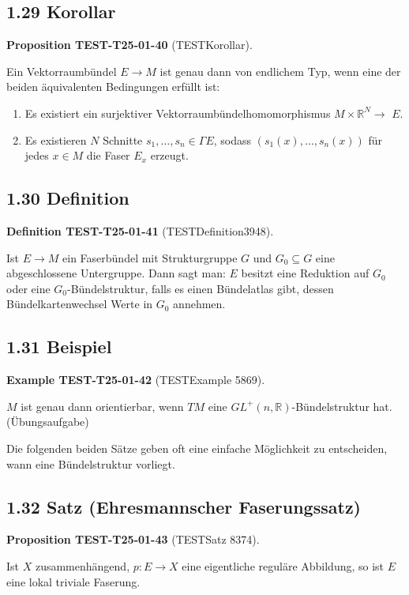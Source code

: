 \documentclass[10pt, letterpaper]{article}
\newcommand{\CustomHeading}[3]{%
  \par\medskip\noindent%
  \textbf{#1 #2} \textnormal{(#3)}.\enskip%
}
\newenvironment{DEF}[2]{\begin{unitbox}\CustomHeading{Definition}{#1}{#2}}{\end{unitbox}}
\newenvironment{PROP}[2]{\begin{unitbox}\CustomHeading{Proposition}{#1}{#2}}{\end{unitbox}}
\newenvironment{EXA}[2]{\begin{unitbox}\CustomHeading{Example}{#1}{#2}}{\end{unitbox}}
\begin{document}
\subsection*{1.29 Korollar}
\begin{PROP}{TEST-T25-01-40}{TESTKorollar}
Ein Vektorraumbündel $E \rightarrow M$ ist genau dann von endlichem Typ, wenn eine der beiden äquivalenten Bedingungen erfüllt ist:

\begin{enumerate}
  \item Es existiert ein surjektiver Vektorraumbündelhomomorphismus $M \times \mathbb{R}^{N} \rightarrow$ $E$.
  \item Es existieren $N$ Schnitte $s_{1}, \ldots, s_{n} \in \Gamma E$, sodass $\left(s_{1}(x), \ldots, s_{n}(x)\right)$ für jedes $x \in M$ die Faser $E_{x}$ erzeugt.
\end{enumerate}
\end{PROP}

\subsection*{1.30 Definition}
\begin{DEF}{TEST-T25-01-41}{TESTDefinition3948}
Ist $E \rightarrow M$ ein Faserbündel mit Strukturgruppe $G$ und $G_{0} \subseteq G$ eine abgeschlossene Untergruppe. Dann sagt man: $E$ besitzt eine Reduktion auf $G_{0}$ oder eine $G_{0}$-Bündelstruktur, falls es einen Bündelatlas gibt, dessen Bündelkartenwechsel Werte in $G_{0}$ annehmen.
\end{DEF}

\subsection*{1.31 Beispiel}
\begin{EXA}{TEST-T25-01-42}{TESTExample 5869}
$M$ ist genau dann orientierbar, wenn $T M$ eine $G L^{+}(n, \mathbb{R})$-Bündelstruktur hat. (Übungsaufgabe)

Die folgenden beiden Sätze geben oft eine einfache Möglichkeit zu entscheiden, wann eine Bündelstruktur vorliegt.
\end{EXA}

\subsection*{1.32 Satz (Ehresmannscher Faserungssatz)}
\begin{PROP}{TEST-T25-01-43}{TESTSatz 8374}
Ist $X$ zusammenhängend, $p: E \rightarrow X$ eine eigentliche reguläre Abbildung, so ist $E$ eine lokal triviale Faserung.
\end{PROP}
\end{document}

